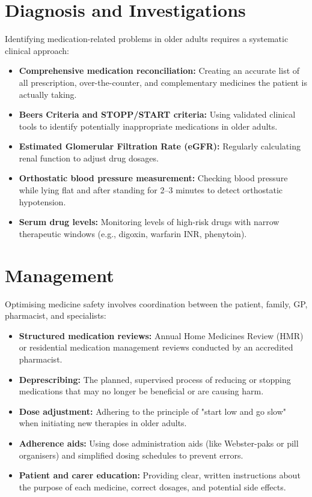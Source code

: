 \section*{Diagnosis and Investigations}
Identifying medication-related problems in older adults requires a systematic clinical approach:

\begin{itemize}
    \item \textbf{Comprehensive medication reconciliation:} Creating an accurate list of all prescription, over-the-counter, and complementary medicines the patient is actually taking.
    \item \textbf{Beers Criteria and STOPP/START criteria:} Using validated clinical tools to identify potentially inappropriate medications in older adults.
    \item \textbf{Estimated Glomerular Filtration Rate (eGFR):} Regularly calculating renal function to adjust drug dosages.
    \item \textbf{Orthostatic blood pressure measurement:} Checking blood pressure while lying flat and after standing for 2--3 minutes to detect orthostatic hypotension.
    \item \textbf{Serum drug levels:} Monitoring levels of high-risk drugs with narrow therapeutic windows (e.g., digoxin, warfarin INR, phenytoin).
\end{itemize}

\section*{Management}
Optimising medicine safety involves coordination between the patient, family, GP, pharmacist, and specialists:

\begin{itemize}
    \item \textbf{Structured medication reviews:} Annual Home Medicines Review (HMR) or residential medication management reviews conducted by an accredited pharmacist.
    \item \textbf{Deprescribing:} The planned, supervised process of reducing or stopping medications that may no longer be beneficial or are causing harm.
    \item \textbf{Dose adjustment:} Adhering to the principle of "start low and go slow" when initiating new therapies in older adults.
    \item \textbf{Adherence aids:} Using dose administration aids (like Webster-paks or pill organisers) and simplified dosing schedules to prevent errors.
    \item \textbf{Patient and carer education:} Providing clear, written instructions about the purpose of each medicine, correct dosages, and potential side effects.
\end{itemize}

